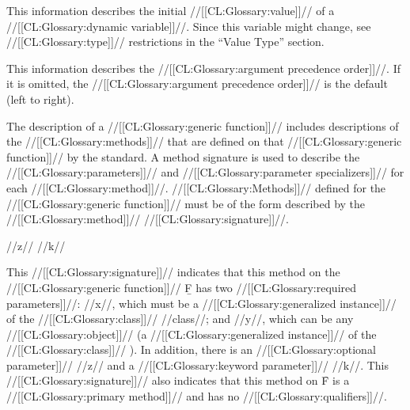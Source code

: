 \endsubsubsection%


This information describes the initial //[[CL:Glossary:value]]// of a //[[CL:Glossary:dynamic variable]]//. Since this variable might change, see //[[CL:Glossary:type]]// restrictions in the ``Value Type'' section.

\endsubsubsection%

 

This information describes the //[[CL:Glossary:argument precedence order]]//. If it is omitted, the //[[CL:Glossary:argument precedence order]]// is the default (left to right).

\endsubsubsection%


The description of a //[[CL:Glossary:generic function]]// includes descriptions of the //[[CL:Glossary:methods]]// that are defined on that //[[CL:Glossary:generic function]]// by the standard.   A method signature is used to describe the //[[CL:Glossary:parameters]]// and  //[[CL:Glossary:parameter specializers]]// for each //[[CL:Glossary:method]]//.  //[[CL:Glossary:Methods]]// defined for the //[[CL:Glossary:generic function]]// must be of the form described by the //[[CL:Glossary:method]]// //[[CL:Glossary:signature]]//. 

 { 	       	      {\opt} //z// {\key} //k//}

\noindent This //[[CL:Glossary:signature]]// indicates that this method on the //[[CL:Glossary:generic function]]// \b{F} has two //[[CL:Glossary:required parameters]]//:
     //x//, which must be a //[[CL:Glossary:generalized instance]]// of the //[[CL:Glossary:class]]// //class//;
 and //y//, which can  be any //[[CL:Glossary:object]]// 
       (\ie a //[[CL:Glossary:generalized instance]]// of the //[[CL:Glossary:class]]// ). In addition, there is an //[[CL:Glossary:optional parameter]]// //z// and a //[[CL:Glossary:keyword parameter]]// //k//.  This //[[CL:Glossary:signature]]// also indicates that this method on \f{F} is a //[[CL:Glossary:primary method]]// and has no //[[CL:Glossary:qualifiers]]//.

